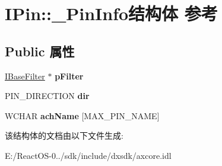 \hypertarget{struct_i_pin_1_1___pin_info}{}\section{I\+Pin\+:\+:\+\_\+\+Pin\+Info结构体 参考}
\label{struct_i_pin_1_1___pin_info}
\subsection*{Public 属性}
\begin{DoxyCompactItemize}
\item 
\mbox{\label{struct_i_pin_1_1___pin_info_adf35dcf4263ccebf9ae87433805bdd13}} 
\hyperlink{interface_i_base_filter}{I\+Base\+Filter} $\ast$ {\bfseries p\+Filter}
\item 
\mbox{\label{struct_i_pin_1_1___pin_info_a301201644ccbf0e0c37eb04fc18ec812}} 
P\+I\+N\+\_\+\+D\+I\+R\+E\+C\+T\+I\+ON {\bfseries dir}
\item 
\mbox{\label{struct_i_pin_1_1___pin_info_a8fab133aa2440e50cdf714e91ba036c3}} 
W\+C\+H\+AR {\bfseries ach\+Name} \mbox{[}M\+A\+X\+\_\+\+P\+I\+N\+\_\+\+N\+A\+ME\mbox{]}
\end{DoxyCompactItemize}


该结构体的文档由以下文件生成\+:\begin{DoxyCompactItemize}
\item 
E\+:/\+React\+O\+S-\/0../sdk/include/dxsdk/axcore.\+idl\end{DoxyCompactItemize}
